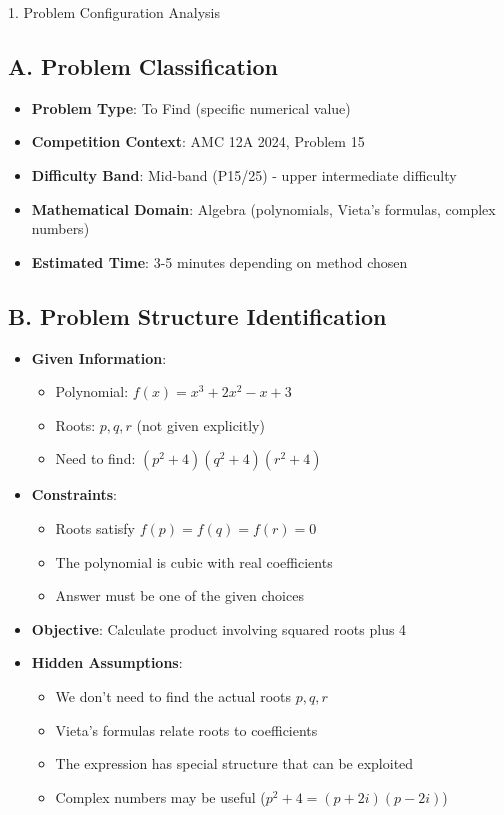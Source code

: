 \documentclass[12pt]{article}
\begin{document}
\begin{configbox}{1. Problem Configuration Analysis}

\subsection*{A. Problem Classification}
\begin{itemize}[leftmargin=*]
    \item \textbf{Problem Type}: To Find (specific numerical value)
    \item \textbf{Competition Context}: AMC 12A 2024, Problem 15
    \item \textbf{Difficulty Band}: Mid-band (P15/25) - upper intermediate difficulty
    \item \textbf{Mathematical Domain}: Algebra (polynomials, Vieta's formulas, complex numbers)
    \item \textbf{Estimated Time}: 3-5 minutes depending on method chosen
\end{itemize}

\subsection*{B. Problem Structure Identification}
\begin{itemize}[leftmargin=*]
    \item \textbf{Given Information}: 
    \begin{itemize}
        \item Polynomial: $f(x) = x^3 + 2x^2 - x + 3$
        \item Roots: $p, q, r$ (not given explicitly)
        \item Need to find: $(p^2 + 4)(q^2 + 4)(r^2 + 4)$
    \end{itemize}
    
    \item \textbf{Constraints}: 
    \begin{itemize}
        \item Roots satisfy $f(p) = f(q) = f(r) = 0$
        \item The polynomial is cubic with real coefficients
        \item Answer must be one of the given choices
    \end{itemize}
    
    \item \textbf{Objective}: Calculate product involving squared roots plus 4
    
    \item \textbf{Hidden Assumptions}: 
    \begin{itemize}
        \item We don't need to find the actual roots $p, q, r$
        \item Vieta's formulas relate roots to coefficients
        \item The expression has special structure that can be exploited
        \item Complex numbers may be useful ($p^2 + 4 = (p + 2i)(p - 2i)$)
    \end{itemize}
    

\end{itemize}
\end{configbox}
\end{document}
